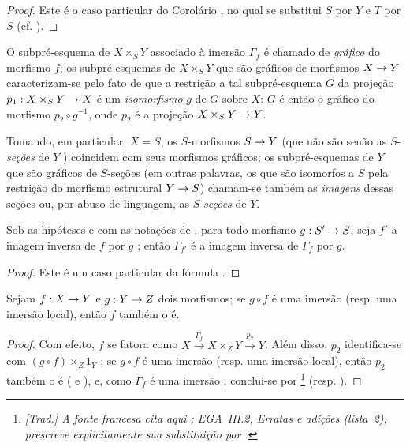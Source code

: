 \documentclass[oneside]{amsart}
\makeatletter
\newcommand{\ega@arrow}[2]{\mathchoice{#1}{#2}{#2}{#2}}
\renewcommand{\to}{\ega@arrow{\longrightarrow}{\rightarrow}}
\newcommand{\oldpage}[2][]{{\marginnote{\normalfont\textbf{#1}~|~#2}}\ignorespaces}
\let\EGAOriginalLabel\label
\renewcommand{\label}[1]{\phantomsection\EGAOriginalLabel{#1}}
\makeatother
\begin{document}
\begin{proof}
Este é o caso particular do Corolário , no qual se substitui $S$ por $Y$ e $T$ por $S$ (cf. ).
\end{proof}

\oldpage[I]{134}
O subpré-esquema de $X\times_S Y$ associado à imersão $\Gamma_f$  é chamado de \emph{gráfico} do morfismo $f$;
os subpré-esquemas de $X\times_S Y$ que são gráficos de morfismos $X\to Y$ caracterizam-se pelo fato de que a restrição a tal subpré-esquema $G$ da projeção $p_1:X\times_S Y\to X$ é um \emph{isomorfismo} $g$ de $G$ sobre $X$:
$G$ é então o gráfico do morfismo $p_2\circ g^{-1}$, onde $p_2$ é a projeção $X\times_S Y\to Y$.

Tomando, em particular, $X=S$, os $S$-morfismos $S\to Y$ (que não são senão as $S$-\emph{seções} de $Y$ ) coincidem com seus morfismos gráficos;
os subpré-esquemas de $Y$ que são gráficos de $S$-seções (em outras palavras, os que são isomorfos a $S$ pela restrição do morfismo estrutural $Y\to S$) chamam-se também as \emph{imagens} dessas seções ou, por abuso de linguagem, as $S$-\emph{seções} de $Y$.

\begin{corollary}[5.3.12]
\label{I.5.3.12}
Sob as hipóteses e com as notações de , para todo morfismo $g:S'\to S$, seja $f'$ a imagem inversa de $f$ por $g$ ;
então $\Gamma_{f'}$ é a imagem inversa de $\Gamma_f$ por $g$.
\end{corollary}

\begin{proof}
Este é um caso particular da fórmula .
\end{proof}

\begin{corollary}[5.3.13]
\label{I.5.3.13}
Sejam $f:X\to Y$ e $g:Y\to Z$ dois morfismos;
se $g\circ f$ é uma imersão (resp. uma imersão local), então $f$ também o é.
\end{corollary}

\begin{proof}
Com efeito, $f$ se fatora como $X\xrightarrow{\Gamma_f}X\times_Z Y\xrightarrow{p_2}Y$.
Além disso, $p_2$ identifica-se com $(g\circ f)\times_Z 1_Y$ ;
se $g\circ f$ é uma imersão (resp. uma imersão local), então $p_2$ também o é ( e ), e, como $\Gamma_f$ é uma imersão , conclui-se por \footnote{\emph{[Trad.] A fonte francesa cita aqui ; EGA~III.2, Erratas e adições (lista~2), prescreve explicitamente sua substituição por .}} (resp. ).
\end{proof}
\end{document}
